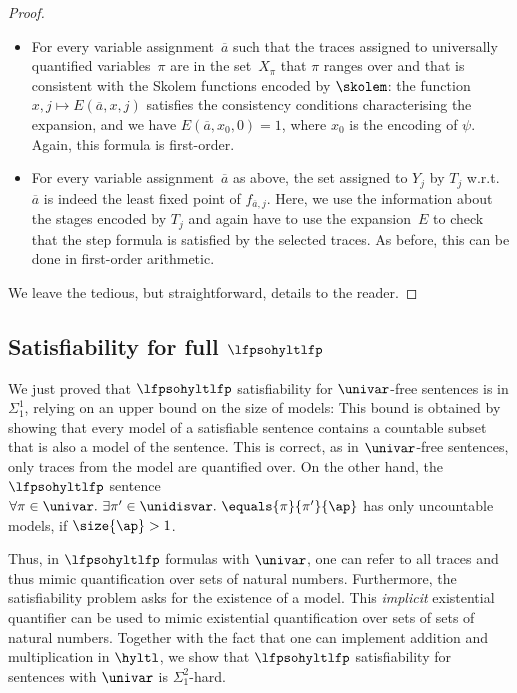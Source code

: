 \begin{proof}
\begin{itemize}
    \item For every variable assignment~$\overline{a}$ such that the traces assigned to universally quantified variables~$\pi$ are in the set~$X_\pi$ that $\pi$ ranges over and that is consistent with the Skolem functions encoded by $\skolem$: the function~$x,j\mapsto E(\overline{a}, x, j)$ satisfies the consistency conditions characterising the expansion, and we have $E(\overline{a},x_0, 0) = 1$, where $x_0$ is the encoding of $\psi$. 
    Again, this formula is first-order.

    \item For every variable assignment~$\overline{a}$ as above, the set assigned to $Y_j$ by $T_j$ w.r.t.\ $\overline{a}$ is indeed the least fixed point of $f_{\overline{a},j}$. Here, we use the information about the stages encoded by $T_j$ and again have to use the expansion~$E$ to check that the step formula is satisfied by the selected traces. As before, this can be done in first-order arithmetic.
\end{itemize}
We leave the tedious, but straightforward, details to the reader.
\end{proof}

\subsection{\texorpdfstring{Satisfiability for full \boldmath$\lfpsohyltlfp$}{Satisfiability for full Second-order HyperLTL with Least Fixed Points}}

We just proved that $\lfpsohyltlfp$ satisfiability for $\univar$-free sentences is in $\Sigma_1^1$, relying on an upper bound on the size of models: 
This bound is obtained by showing that every model of a satisfiable sentence contains a countable subset that is also a model of the sentence.
This is correct, as in $\univar$-free sentences, only traces from the model are quantified over.
On the other hand, the $\lfpsohyltlfp$ sentence~$\forall \pi \in \univar.\ \exists \pi'\in\unidisvar.\ \equals{\pi}{\pi'}{\ap}$ has only uncountable models, if $\size{\ap}>1$.

Thus, in $\lfpsohyltlfp$ formulas with $\univar$, one can refer to all traces and thus mimic quantification over sets of natural numbers. 
Furthermore, the satisfiability problem asks for the existence of a model. This \emph{implicit} existential quantifier can be used to mimic existential quantification over sets of sets of natural numbers.
Together with the fact that one can implement addition and multiplication in $\hyltl$, we show that $\lfpsohyltlfp$ satisfiability for sentences with $\univar$ is $\Sigma_1^2$-hard.

